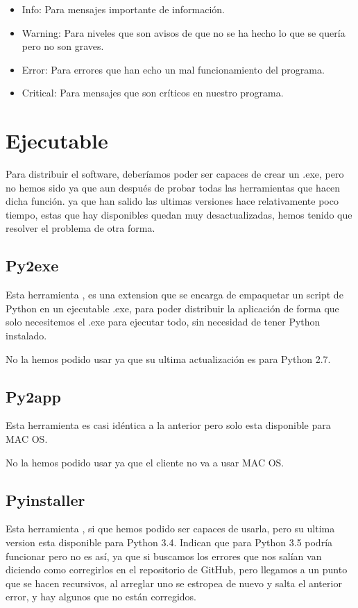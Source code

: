 \begin{itemize}
\item Info: Para mensajes importante de información.
\item Warning: Para niveles que son avisos de que no se ha hecho lo que se quería pero no son graves.
\item Error: Para errores que han echo un mal funcionamiento del programa.
\item Critical: Para mensajes que son críticos en nuestro programa.
\end{itemize}

\section{Ejecutable}
Para distribuir el software, deberíamos poder ser capaces de crear un .exe, pero no hemos sido ya que aun después de probar todas las herramientas que hacen dicha función.
ya que han salido las ultimas versiones hace relativamente poco tiempo, estas que hay disponibles quedan muy desactualizadas, hemos tenido que resolver el problema de otra forma. 

\subsection{Py2exe}
Esta herramienta \cite{p2exe}, es una extension que se encarga de empaquetar un script de Python en un ejecutable .exe, para poder distribuir la aplicación de forma que solo necesitemos el .exe para ejecutar todo, sin necesidad de tener Python instalado.

No la hemos podido usar ya que su ultima actualización es para Python 2.7.

\subsection{Py2app}
Esta herramienta es casi idéntica a la anterior pero solo esta disponible para MAC OS.

No la hemos podido usar ya que el cliente no va a usar MAC OS.

\subsection{Pyinstaller}
Esta herramienta \cite{Pyinstaller}, si que hemos podido ser capaces de usarla, pero su ultima version esta disponible para Python 3.4.
Indican que para Python 3.5 podría funcionar pero no es así, ya que si buscamos los errores que nos salían van diciendo como corregirlos en el repositorio de GitHub, pero llegamos a un punto que se hacen recursivos, al arreglar uno se estropea de nuevo y salta el anterior error, y hay algunos que no están corregidos.

